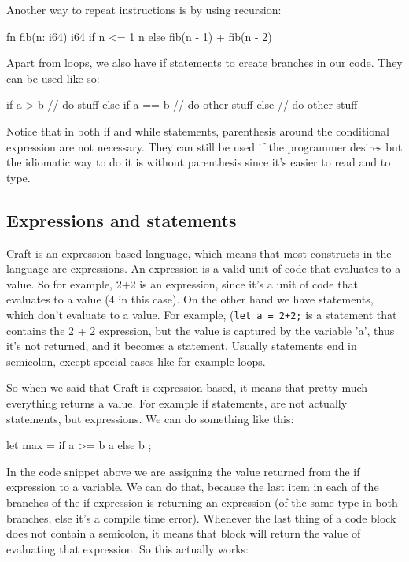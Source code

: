 ﻿\documentclass[10pt,a4paper,twocolumn,twoside]{article}
\begin{document}
Another way to repeat instructions is by using recursion:
\begin{code}
fn fib(n: i64) i64 {
    if n <= 1 {
        n
    } else {
        fib(n - 1) + fib(n - 2)
    }
}
\end{code}

Apart from loops, we also have if statements to create branches in our code. 
They can be used like so:

\begin{code}
    if a > b {
        // do stuff
    } else if a == b {
        // do other stuff
    } else {
        // do other stuff
    }
\end{code}

Notice that in both if and while statements, parenthesis around the conditional 
expression are not necessary. They can still be used if the programmer desires
but the idiomatic way to do it is without parenthesis since it's easier to read 
and to type.

\subsection{Expressions and statements}
Craft is an expression based language, which means that most constructs in the
language are expressions. An expression is a valid unit of code that evaluates
to a value. So for example, 2+2 is an expression, since it's a unit of code that
evaluates to a value (4 in this case). On the other hand we have statements,
which don't evaluate to a value. For example, (\texttt{let a = 2+2;} is a
statement that contains the 2 + 2 expression, but the value is captured by the
variable 'a', thus it's not returned, and it becomes a statement. Usually
statements end in semicolon, except special cases like for example loops.

So when we said that Craft is expression based, it means that pretty much
everything returns a value. For example if statements, are not actually
statements, but expressions. We can do something like this:

\begin{code}
    let max = if a >= b { a } else { b };
\end{code}

In the code snippet above we are assigning the value returned from the if
expression to a variable. We can do that, because the last item in each of the
branches of the if expression is returning an expression (of the same type in
both branches, else it's a compile time error). Whenever the last thing of a
code block does not contain a semicolon, it means that block will return the
value of evaluating that expression. So this actually works: 
\end{document}
